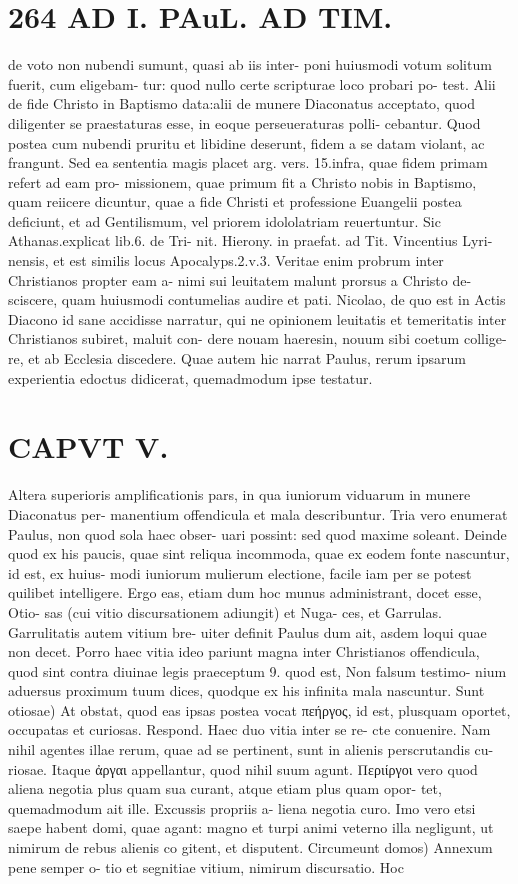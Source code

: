 \documentclass{article}
\begin{document}
\begin{pages}
\section*{264 AD I. PAuL. AD TIM. }de voto non nubendi sumunt, quasi ab iis inter- poni huiusmodi votum solitum fuerit, cum eligebam- tur: quod nullo certe scripturae loco probari po- test. Alii de fide Christo in Baptismo data:alii de munere Diaconatus acceptato, quod diligenter se praestaturas esse, in eoque perseueraturas polli- cebantur. Quod postea cum nubendi pruritu et libidine deserunt, fidem a se datam violant, ac frangunt. Sed ea sententia magis placet arg. vers. 15.infra, quae fidem primam refert ad eam pro- missionem, quae primum fit a Christo nobis in Baptismo, quam reiicere dicuntur, quae a fide Christi et professione Euangelii postea deficiunt, et ad Gentilismum, vel priorem idololatriam reuertuntur. Sic Athanas.explicat lib.6. de Tri- nit. Hierony. in praefat. ad Tit. Vincentius Lyri- nensis, et est similis locus Apocalyps.2.v.3. Veritae enim probrum inter Christianos propter eam a- nimi sui leuitatem malunt prorsus a Christo de- sciscere, quam huiusmodi contumelias audire et pati. Nicolao, de quo est in Actis Diacono id sane accidisse narratur, qui ne opinionem leuitatis et temeritatis inter Christianos subiret, maluit con- dere nouam haeresin, nouum sibi coetum collige- re, et ab Ecclesia discedere. Quae autem hic narrat Paulus, rerum ipsarum experientia edoctus didicerat, quemadmodum ipse testatur.     
\section*{CAPVT  V. }
\marginpar{[ p.285 ]}Altera superioris amplificationis pars, in qua iuniorum viduarum in munere Diaconatus per- manentium offendicula et mala describuntur. Tria vero enumerat Paulus, non quod sola haec obser- uari possint: sed quod maxime soleant. Deinde quod ex his paucis, quae sint reliqua incommoda, quae ex eodem fonte nascuntur, id est, ex huius- modi iuniorum mulierum electione, facile iam per se potest quilibet intelligere. Ergo eas, etiam dum hoc munus administrant, docet esse, Otio- sas (cui vitio discursationem adiungit) et Nuga- ces, et Garrulas. Garrulitatis autem vitium bre- uiter definit Paulus dum ait, asdem loqui quae non decet. Porro haec vitia ideo pariunt magna inter Christianos offendicula, quod sint contra diuinae legis praeceptum 9. quod est, Non falsum testimo- nium aduersus proximum tuum dices, quodque ex his infinita mala nascuntur. Sunt otiosae) At obstat, quod eas ipsas postea vocat πεήργος, id est, plusquam oportet, occupatas et curiosas. Respond. Haec duo vitia inter se re- cte conuenire. Nam nihil agentes illae rerum, quae ad se pertinent, sunt in alienis perscrutandis cu- riosae. Itaque ἀργαι appellantur, quod nihil suum agunt. Περιίργοι vero quod aliena negotia plus quam sua curant, atque etiam plus quam opor- tet, quemadmodum ait ille. Excussis propriis a- liena negotia curo. Imo vero etsi saepe habent domi, quae agant: magno et turpi animi veterno illa negligunt, ut nimirum de rebus alienis co gitent, et disputent. Circumeunt domos) Annexum pene semper o- tio et segnitiae vitium, nimirum discursatio. Hoc 

\end{pages}
\end{document}
